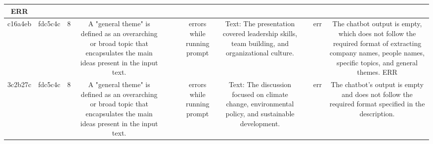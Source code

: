 \begin{table}[h!]
\begin{tabular}{|c|c|c|c|c|c|c|c|c|c|c|}
ERR\\
\hline
c16a4eb & fdc5c4c & 8 & A "general theme" is defined as an overarching or broad topic that encapsulates the main ideas present in the input text. &  &  & errors while running prompt & Text: The presentation covered leadership skills, team building, and organizational culture. &  & err & The chatbot output is empty, which does not follow the required format of extracting company names, people names, specific topics, and general themes.
ERR\\
\hline
3c2b27c & fdc5c4c & 8 & A "general theme" is defined as an overarching or broad topic that encapsulates the main ideas present in the input text. &  &  & errors while running prompt & Text: The discussion focused on climate change, environmental policy, and sustainable development. &  & err & The chatbot's output is empty and does not follow the required format specified in the description.


\end{tabular}
\end{table}
